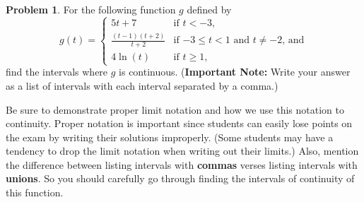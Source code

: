 \documentclass{article}
\theoremstyle{definition}
\newtheorem{Problem}{Problem}
\begin{document}
\begin{Problem}
  For the following function $g$ defined by
  \[
    g(t) =
    \begin{cases}
      5t + 7 & \mbox{if $t < -3$,}\\
      \displaystyle\frac{(t-1)(t+2)}{t+2} & \mbox{if $-3 \leq t < 1$ and $t \neq -2$, and}\\
      4 \ln(t) & \mbox{if $t \geq 1$,}
    \end{cases}
  \]
  find the intervals where $g$ is continuous.
  (\textbf{Important Note:} Write your answer as a list of intervals with each interval separated by a comma.)
\end{Problem}
\begin{Instructor Notes}
  Be sure to demonstrate proper limit notation and how we use this notation to continuity.
  Proper notation is important since students can easily lose points on the exam by writing their solutions improperly.
  (Some students may have a tendency to drop the limit notation when writing out their limits.)
  Also, mention the difference between listing intervals with \textbf{commas} verses listing intervals with \textbf{unions}.
  So you should carefully go through finding the intervals of continuity of this function.
\end{Instructor Notes}
\end{document}
